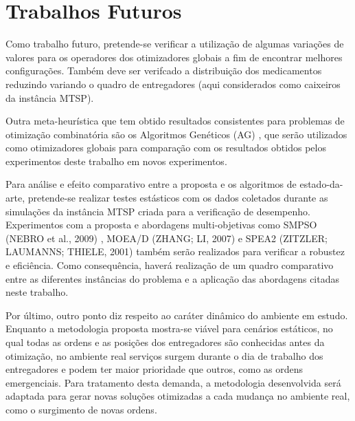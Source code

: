 \section{Trabalhos Futuros}

Como trabalho futuro, pretende-se verificar a utilização de algumas variações de valores para os operadores dos otimizadores globais a fim de encontrar melhores configurações. Também deve ser verifcado a distribuição dos medicamentos reduzindo variando o quadro de entregadores (aqui considerados como caixeiros da instância MTSP).

Outra meta-heurística que tem obtido resultados consistentes para problemas de otimização combinatória são os Algoritmos Genéticos (AG) \cite{somhom1999competition}, que serão utilizados como otimizadores globais para comparação com os resultados obtidos pelos experimentos deste trabalho em novos experimentos.

Para análise e efeito comparativo entre a proposta e os algoritmos de estado-da-arte, pretende-se realizar testes estásticos com os dados coletados durante as simulações da instância MTSP criada para a verificação de desempenho. Experimentos com a proposta e abordagens multi-objetivas como SMPSO (NEBRO et al., 2009) \cite{nebro2009}, MOEA/D (ZHANG; LI, 2007) \cite{zhang2007} e SPEA2 (ZITZLER; LAUMANNS; THIELE, 2001) \cite{zitzler2001} também serão realizados para verificar a robustez e eficiência. Como consequência, haverá realização de um quadro comparativo entre as diferentes instâncias do problema e a aplicação das abordagens citadas neste trabalho.

Por último, outro ponto diz respeito ao caráter dinâmico do ambiente em estudo. Enquanto a metodologia proposta mostra-se viável para cenários estáticos, no qual todas as ordens e as posições dos entregadores são conhecidas antes da otimização, no ambiente real serviços surgem durante o dia de trabalho dos entregadores e podem ter maior prioridade que outros, como as ordens emergenciais. Para tratamento desta demanda, a metodologia desenvolvida será adaptada para gerar novas soluções otimizadas a cada mudança no ambiente real, como o surgimento de novas ordens.
